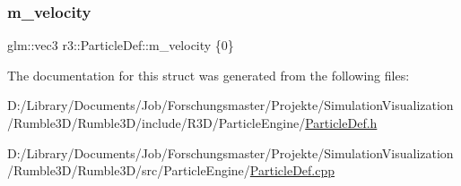 \mbox{\label{structr3_1_1_particle_def_a0c69fb8b0e2994e5ff24aa1156bdb5fd}} 
\subsubsection{\texorpdfstring{m\+\_\+velocity}{m\_velocity}}
{\footnotesize\ttfamily glm\+::vec3 r3\+::\+Particle\+Def\+::m\+\_\+velocity \{0\}}



The documentation for this struct was generated from the following files\+:\begin{DoxyCompactItemize}
\item 
D\+:/\+Library/\+Documents/\+Job/\+Forschungsmaster/\+Projekte/\+Simulation\+Visualization/\+Rumble3\+D/\+Rumble3\+D/include/\+R3\+D/\+Particle\+Engine/\mbox{\hyperlink{_particle_def_8h}{Particle\+Def.\+h}}\item 
D\+:/\+Library/\+Documents/\+Job/\+Forschungsmaster/\+Projekte/\+Simulation\+Visualization/\+Rumble3\+D/\+Rumble3\+D/src/\+Particle\+Engine/\mbox{\hyperlink{_particle_def_8cpp}{Particle\+Def.\+cpp}}\end{DoxyCompactItemize}
